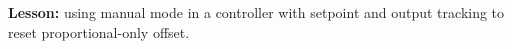 












{\bf Lesson:} using manual mode in a controller with setpoint and output tracking to reset proportional-only offset.





